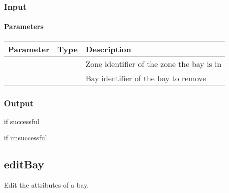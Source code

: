 \documentclass[letterpaper,10pt,english]{sphinxmanual}
\let\oldsubsection\subsection
\renewcommand{\subsection}{\needspace{6\baselineskip}\oldsubsection}
\begin{document}
\subsubsection{Input}
\label{\detokenize{docs/Developer/removeBay:input}}
\begin{sphinxVerbatim}[commandchars=\\\{\}]
   
   
\end{sphinxVerbatim}


\paragraph{Parameters}
\label{\detokenize{docs/Developer/removeBay:parameters}}

\begin{savenotes}\sphinxattablestart
\centering
\begin{tabulary}{\linewidth}[t]{|T|T|T|}
\hline
\sphinxstyletheadfamily 
Parameter
&\sphinxstyletheadfamily 
Type
&\sphinxstyletheadfamily 
Description
\\
\hline
{}
&
&
Zone identifier of the zone the bay is in
\\
\hline
{}
&
&
Bay identifier of the bay to remove
\\
\hline
\end{tabulary}
\par
\sphinxattableend\end{savenotes}


\subsubsection{Output}
\label{\detokenize{docs/Developer/removeBay:output}}
 if successful

 if unsuccessful


\subsection{editBay}
\label{\detokenize{docs/Developer/editBay:editbay}}\label{\detokenize{docs/Developer/editBay::doc}}
Edit the attributes of a bay.
\end{document}
